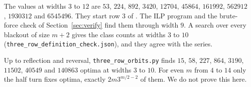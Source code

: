 The values at widths $3$ to $12$ are $53$, $224$, $892$, $3420$, $12704$, $45864$, $161992$,
$562912$, $1930312$ and $6545496$. They start row $3$ of . The ILP program and
the brute-force check of Section~\ref{sec:verify} find them through width $9$. A search over
every blackout of size $m+2$ gives the class counts at widths $3$ to $10$
(\texttt{three\_row\_definition\_check.json}), and they agree with the series.

\begin{remark}\label{rem:threeorbits}
Up to reflection and reversal, \texttt{three\_row\_orbits.py} finds $15$, $58$, $227$, $864$,
$3190$, $11502$, $40549$ and $140863$ optima at widths $3$ to $10$. For even $m$ from $4$ to
$14$ only the half turn fixes optima, exactly $2m3^{m/2-2}$ of them. We do not prove this here.

\end{remark}
